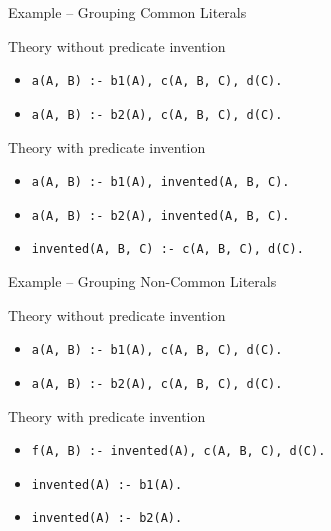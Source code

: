 \documentclass[presentation]{beamer}\mode<presentation>{\usetheme{AMSBolognaFC}}
\begin{document}
\begin{frame}{Example -- Grouping Common Literals}

    \begin{block}{Theory without predicate invention}%
        \begin{itemize}
            \item \texttt{a(A, B) :- b1(A), \alert{c(A, B, C), d(C)}.}
            \item \texttt{a(A, B) :- b2(A), \alert{c(A, B, C), d(C)}.}
        \end{itemize}
    \end{block}

    \begin{exampleblock}{Theory with predicate invention}
        \begin{itemize}
            \item \texttt{a(A, B) :- b1(A), invented(A, B, C).}
            \item \texttt{a(A, B) :- b2(A), invented(A, B, C).}
            \item \texttt{invented(A, B, C) :- \alert{c(A, B, C), d(C)}.}
        \end{itemize}
    \end{exampleblock}

\end{frame}

\begin{frame}{Example -- Grouping Non-Common Literals}

    \begin{block}{Theory without predicate invention}%
        \begin{itemize}
            \item \texttt{a(A, B) :- \alert{b1(A)}, c(A, B, C), d(C).}
            \item \texttt{a(A, B) :- \alert{b2(A)}, c(A, B, C), d(C).}
        \end{itemize}
    \end{block}
    
    \begin{exampleblock}{Theory with predicate invention}%
        \begin{itemize}
            \item \texttt{f(A, B) :- invented(A), c(A, B, C), d(C).}
            \item \texttt{invented(A) :- \alert{b1(A)}.}
            \item \texttt{invented(A) :- \alert{b2(A)}.}
        \end{itemize}
    \end{exampleblock} 
\end{frame}
\end{document}
